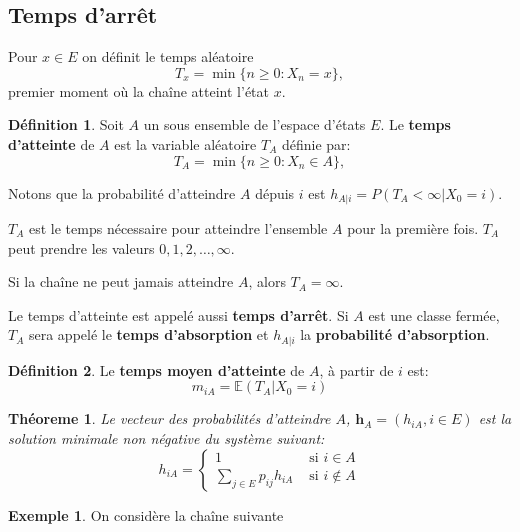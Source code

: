 \documentclass[
]{book}
\newtheorem{theorem}{Théoreme}[chapter]
\theoremstyle{definition}
\newtheorem{definition}{Définition}[chapter]
\theoremstyle{definition}
\newtheorem{example}{Exemple}[chapter]
\theoremstyle{definition}
\theoremstyle{remark}
\begin{document}
\hypertarget{temps-darruxeat}{%
\subsection{Temps d'arrêt}\label{temps-darruxeat}}

Pour \(x \in E\) on définit le temps aléatoire
\[
T_x = \min\{n \geq 0 : X_n = x\},
\]
premier moment où la chaîne atteint l'état \(x\).

\begin{definition}
\protect\hypertarget{def:unnamed-chunk-66}{}{\label{def:unnamed-chunk-66} }Soit \(A\) un sous ensemble de l'espace d'états \(E\). Le \textbf{temps d'atteinte} de \(A\) est la variable aléatoire \(T_A\) définie par:
\[
T_A = \min\{n \geq 0 : X_n \in A \},
\]
\end{definition}

Notons que la probabilité d'atteindre \(A\) dépuis \(i\) est \(h_{A|i} = P(T_A < \infty |X_0 = i)\).

\(T_A\) est le temps nécessaire pour atteindre l'ensemble \(A\) pour la première fois. \(T_A\) peut prendre les valeurs \(0,1,2,\ldots , \infty\).

Si la chaîne ne peut jamais atteindre \(A\), alors \(T_A= \infty\).

Le temps d'atteinte est appelé aussi \textbf{temps d'arrêt}. Si \(A\) est une classe fermée, \(T_A\) sera appelé le \textbf{temps d'absorption} et \(h_{A|i}\) la \textbf{probabilité d'absorption}.

\begin{definition}
\protect\hypertarget{def:unnamed-chunk-67}{}{\label{def:unnamed-chunk-67} }Le \textbf{temps moyen d'atteinte} de \(A\), à partir de \(i\) est:
\[ m_{iA}=\mathbb{E}\left(T_A | X_0=i \right)\]
\end{definition}

\begin{theorem}
\protect\hypertarget{thm:unnamed-chunk-68}{}{\label{thm:unnamed-chunk-68} }Le vecteur des probabilités d'atteindre \(A\), \(\mathbf{h}_A=(h_{iA}, i \in E)\) est la solution minimale non négative du système suivant:
\[
h_{iA}=\left\{
\begin{array}{ll}
1 & \text{ si } i \in A\\
\displaystyle \sum_{j \in E}p_{ij}h_{iA} & \text{ si } i \notin A
\end{array}
\right.
\]
\end{theorem}

\begin{example}
\protect\hypertarget{exm:unnamed-chunk-69}{}{\label{exm:unnamed-chunk-69} }On considère la chaîne suivante
\end{example}
\end{document}
